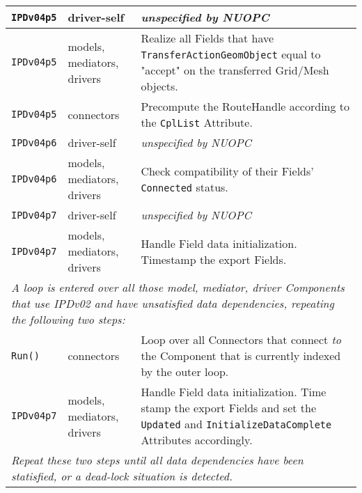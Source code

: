 \begin{longtable}[h]{|p{35mm}|p{4cm}|p{6cm}|}
     {\tt IPDv04p5}   & driver-self                 & {\em unspecified by NUOPC}\\ \hline
     {\tt IPDv04p5}   & models, mediators, drivers  & Realize all Fields that have {\tt TransferActionGeomObject} equal to "accept" on the transferred Grid/Mesh objects.\\ \hline
     {\tt IPDv04p5}   & connectors                  & Precompute the RouteHandle according to the {\tt CplList} Attribute.\\ \hline
     {\tt IPDv04p6}   & driver-self                 & {\em unspecified by NUOPC}\\ \hline
     {\tt IPDv04p6}   & models, mediators, drivers  & Check compatibility of their Fields' {\tt Connected} status.\\ \hline
     {\tt IPDv04p7}   & driver-self                 & {\em unspecified by NUOPC}\\ \hline
     {\tt IPDv04p7}   & models, mediators, drivers  & Handle Field data initialization. Timestamp the export Fields.\\ \hline
     \multicolumn{3}{|p{13.5cm}|}{\it A loop is entered over all those model, mediator, driver Components that use IPDv02 and have
     unsatisfied data dependencies, repeating the following two steps:}\\ \hline
     {\tt Run()}      & connectors                  & Loop over all Connectors that connect {\it to} the Component that is currently indexed by the outer loop.\\ \hline
     {\tt IPDv04p7}   & models, mediators, drivers  & Handle Field data initialization. Time stamp the export Fields and set the {\tt Updated} and {\tt InitializeDataComplete} Attributes accordingly.\\ \hline
     \multicolumn{3}{|p{13.5cm}|}{\it Repeat these two steps until all data
     dependencies have been statisfied, or a dead-lock situation is detected.}\\ 
     \hline\hline
\end{longtable}
